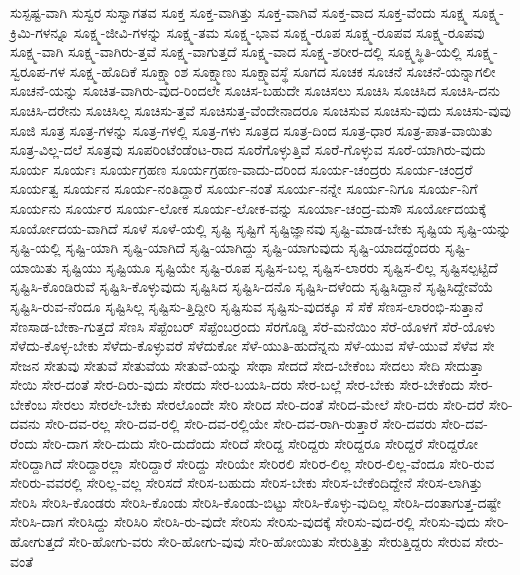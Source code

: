 {ಸುಸ್ಪಷ್ಟ-ವಾಗಿ
ಸುಸ್ವರ
ಸುಸ್ವಾಗತವ
ಸೂಕ್ತ
ಸೂಕ್ತ-ವಾಗಿತ್ತು
ಸೂಕ್ತ-ವಾಗಿವೆ
ಸೂಕ್ತ-ವಾದ
ಸೂಕ್ತ-ವೆಂದು
ಸೂಕ್ಷ್ಮ
ಸೂಕ್ಷ್ಮ-ಕ್ರಿಮಿ-ಗಳನ್ನೂ
ಸೂಕ್ಷ್ಮ-ಜೀವಿ-ಗಳನ್ನು
ಸೂಕ್ಷ್ಮ-ತಮ
ಸೂಕ್ಷ್ಮ-ಭಾವ
ಸೂಕ್ಷ್ಮ-ರೂಪ
ಸೂಕ್ಷ್ಮ-ರೂಪವ
ಸೂಕ್ಷ್ಮ-ರೂಪವು
ಸೂಕ್ಷ್ಮ-ವಾಗಿ
ಸೂಕ್ಷ್ಮ-ವಾಗಿರು-ತ್ತವೆ
ಸೂಕ್ಷ್ಮ-ವಾಗುತ್ತದೆ
ಸೂಕ್ಷ್ಮ-ವಾದ
ಸೂಕ್ಷ್ಮ-ಶರೀರ-ದಲ್ಲಿ
ಸೂಕ್ಷ್ಮಸ್ಥಿತಿ-ಯಲ್ಲಿ
ಸೂಕ್ಷ್ಮ-ಸ್ವರೂಪ-ಗಳ
ಸೂಕ್ಷ್ಮ-ಹೊದಿಕೆ
ಸೂಕ್ಷ್ಮಾಂಶ
ಸೂಕ್ಷ್ಮಾಣು
ಸೂಕ್ಷ್ಮಾವಸ್ಥೆ
ಸೂಗದ
ಸೂಚಕ
ಸೂಚನೆ
ಸೂಚನೆ-ಯನ್ನಾಗಲೀ
ಸೂಚನೆ-ಯನ್ನು
ಸೂಚಿತ-ವಾಗಿರು-ವುದ-ರಿಂದಲೇ
ಸೂಚಿಸ-ಬಹುದೇ
ಸೂಚಿಸಲು
ಸೂಚಿಸಿ
ಸೂಚಿಸಿದ
ಸೂಚಿಸಿ-ದನು
ಸೂಚಿಸಿ-ದರೇನು
ಸೂಚಿಸಿಲ್ಲ
ಸೂಚಿಸು-ತ್ತವೆ
ಸೂಚಿಸುತ್ತ-ವೆಂದೇನಾದರೂ
ಸೂಚಿಸುವ
ಸೂಚಿಸು-ವುದು
ಸೂಚಿಸು-ವುವು
ಸೂಜಿ
ಸೂತ್ರ
ಸೂತ್ರ-ಗಳನ್ನು
ಸೂತ್ರ-ಗಳಲ್ಲಿ
ಸೂತ್ರ-ಗಳು
ಸೂತ್ರದ
ಸೂತ್ರ-ದಿಂದ
ಸೂತ್ರ-ಧಾರ
ಸೂತ್ರ-ಪಾತ-ವಾಯಿತು
ಸೂತ್ರ-ವಿಲ್ಲ-ದಲೆ
ಸೂತ್ರವು
ಸೂಪರಿಂಟೆಂಡೆಂಟ-ರಾದ
ಸೂರೆಗೊಳ್ಳುತ್ತಿವೆ
ಸೂರೆ-ಗೊಳ್ಳುವ
ಸೂರೆ-ಯಾಗಿರು-ವುದು
ಸೂರ್ಯ
ಸೂರ್ಯಃ
ಸೂರ್ಯಗ್ರಹಣ
ಸೂರ್ಯಗ್ರಹಣ-ವಾದು-ದರಿಂದ
ಸೂರ್ಯ-ಚಂದ್ರರು
ಸೂರ್ಯ-ಚಂದ್ರರೆ
ಸೂರ್ಯತ್ವ
ಸೂರ್ಯನ
ಸೂರ್ಯ-ನಂತಿದ್ದಾರೆ
ಸೂರ್ಯ-ನಂತೆ
ಸೂರ್ಯ-ನನ್ನೇ
ಸೂರ್ಯ-ನಿಗೂ
ಸೂರ್ಯ-ನಿಗೆ
ಸೂರ್ಯನು
ಸೂರ್ಯರ
ಸೂರ್ಯ-ಲೋಕ
ಸೂರ್ಯ-ಲೋಕ-ವನ್ನು
ಸೂರ್ಯಾ-ಚಂದ್ರ-ಮಸೌ
ಸೂರ್ಯೋದಯಕ್ಕೆ
ಸೂರ್ಯೋದಯ-ವಾಗಿದೆ
ಸೂಳೆ
ಸೂಳೆ-ಯಲ್ಲಿ
ಸೃಷ್ಟಿ
ಸೃಷ್ಟಿಗೆ
ಸೃಷ್ಟಿಜ್ಞಾನವು
ಸೃಷ್ಟಿ-ಮಾಡ-ಬೇಕು
ಸೃಷ್ಟಿಯ
ಸೃಷ್ಟಿ-ಯನ್ನು
ಸೃಷ್ಟಿ-ಯಲ್ಲಿ
ಸೃಷ್ಟಿ-ಯಾಗಿ
ಸೃಷ್ಟಿ-ಯಾಗಿದೆ
ಸೃಷ್ಟಿ-ಯಾಗಿದ್ದು
ಸೃಷ್ಟಿ-ಯಾಗುವುದು
ಸೃಷ್ಟಿ-ಯಾದದ್ದೆಂದರು
ಸೃಷ್ಟಿ-ಯಾಯಿತು
ಸೃಷ್ಟಿಯು
ಸೃಷ್ಟಿಯೂ
ಸೃಷ್ಟಿಯೇ
ಸೃಷ್ಟಿ-ರೂಪ
ಸೃಷ್ಟಿಸ-ಬಲ್ಲ
ಸೃಷ್ಟಿಸ-ಲಾರರು
ಸೃಷ್ಟಿಸ-ಲಿಲ್ಲ
ಸೃಷ್ಟಿಸಲ್ಪಟ್ಟಿದೆ
ಸೃಷ್ಟಿಸಿ-ಕೊಂಡಿರುವೆ
ಸೃಷ್ಟಿಸಿ-ಕೊಳ್ಳುವುದು
ಸೃಷ್ಟಿಸಿದ
ಸೃಷ್ಟಿಸಿ-ದನೊ
ಸೃಷ್ಟಿಸಿ-ದಳೆಂದು
ಸೃಷ್ಟಿಸಿದ್ದಾನೆ
ಸೃಷ್ಟಿಸಿದ್ದೇವೆಯೆ
ಸೃಷ್ಟಿಸಿ-ರುವ-ನೆಂದೂ
ಸೃಷ್ಟಿಸಿಲ್ಲ
ಸೃಷ್ಟಿಸು-ತ್ತಿದ್ದೀರಿ
ಸೃಷ್ಟಿಸುವ
ಸೃಷ್ಟಿಸು-ವುದಕ್ಕೂ
ಸೆ
ಸೆಕೆ
ಸೆಣಸ-ಲಾರಂಭಿ-ಸುತ್ತಾನೆ
ಸೆಣಸಾಡ-ಬೇಕಾ-ಗುತ್ತದೆ
ಸೆಣಸಿ
ಸೆಪ್ಟೆಂಬರ್
ಸೆಪ್ಟೆಂಬರ್ರಂದು
ಸೆರಗೊಡ್ಡಿ
ಸೆರೆ-ಮನೆಯಿಂ
ಸೆರೆ-ಯೊಳಗೆ
ಸೆರೆ-ಯೊಳು
ಸೆಳೆದು-ಕೊಳ್ಳ-ಬೇಕು
ಸೆಳೆದು-ಕೊಳ್ಳುವರೆ
ಸೆಳೆದುಕೋ
ಸೆಳೆ-ಯುತಿ-ಹುದೆನ್ನನು
ಸೆಳೆ-ಯುವ
ಸೆಳೆ-ಯುವೆ
ಸೆಳೆವ
ಸೇ
ಸೇಜನ
ಸೇತುವು
ಸೇತುವೆ
ಸೇತುವೆಯ
ಸೇತುವೆ-ಯನ್ನು
ಸೇಥಾ
ಸೇದದೆ
ಸೇದ-ಬೇಕೆಂಬ
ಸೇದಲು
ಸೇದಿ
ಸೇದುತ್ತಾ
ಸೇಯಿ
ಸೇರ-ದಂತೆ
ಸೇರ-ದಿರು-ವುದು
ಸೇರದು
ಸೇರ-ಬಯಸಿ-ದರು
ಸೇರ-ಬಲ್ಲೆ
ಸೇರ-ಬೇಕು
ಸೇರ-ಬೇಕೆಂದು
ಸೇರ-ಬೇಕೆಂಬ
ಸೇರಲು
ಸೇರಲೇ-ಬೇಕು
ಸೇರಲೊಂದೇ
ಸೇರಿ
ಸೇರಿದ
ಸೇರಿ-ದಂತೆ
ಸೇರಿದ-ಮೇಲೆ
ಸೇರಿ-ದರು
ಸೇರಿ-ದರೆ
ಸೇರಿ-ದವನು
ಸೇರಿ-ದವ-ರಲ್ಲ
ಸೇರಿ-ದವ-ರಲ್ಲಿ
ಸೇರಿ-ದವ-ರಲ್ಲಿಯೇ
ಸೇರಿ-ದವ-ರಾಗಿ-ರುತ್ತಾರೆ
ಸೇರಿ-ದವರು
ಸೇರಿ-ದವ-ರೆಂದು
ಸೇರಿ-ದಾಗ
ಸೇರಿ-ದುದು
ಸೇರಿ-ದುದೆಂದು
ಸೇರಿದೆ
ಸೇರಿದ್ದ
ಸೇರಿದ್ದರು
ಸೇರಿದ್ದರೂ
ಸೇರಿದ್ದರೆ
ಸೇರಿದ್ದರೋ
ಸೇರಿದ್ದಾಗಿದೆ
ಸೇರಿದ್ದಾರಲ್ಲಾ
ಸೇರಿದ್ದಾರೆ
ಸೇರಿದ್ದು
ಸೇರಿಯೇ
ಸೇರಿರಲಿ
ಸೇರಿರ-ಲಿಲ್ಲ
ಸೇರಿರ-ಲಿಲ್ಲ-ವೆಂದೂ
ಸೇರಿ-ರುವ
ಸೇರಿರು-ವವರಲ್ಲಿ
ಸೇರಿಲ್ಲ-ವಲ್ಲ
ಸೇರಿಸದೆ
ಸೇರಿಸ-ಬಹುದು
ಸೇರಿಸ-ಬೇಕು
ಸೇರಿಸ-ಬೇಕೆಂದಿದ್ದೇನೆ
ಸೇರಿಸ-ಲಾಗಿತ್ತು
ಸೇರಿಸಿ
ಸೇರಿಸಿ-ಕೊಂಡರು
ಸೇರಿಸಿ-ಕೊಂಡು
ಸೇರಿಸಿ-ಕೊಂಡು-ಬಿಟ್ಟು
ಸೇರಿಸಿ-ಕೊಳ್ಳು-ವುದಿಲ್ಲ
ಸೇರಿಸಿ-ದಂತಾಗುತ್ತ-ದಷ್ಟೇ
ಸೇರಿಸಿ-ದಾಗ
ಸೇರಿಸಿದ್ದು
ಸೇರಿಸಿರಿ
ಸೇರಿಸಿ-ರು-ವುದೇ
ಸೇರಿಸು
ಸೇರಿಸು-ವುದಕ್ಕೆ
ಸೇರಿಸು-ವುದ-ರಲ್ಲಿ
ಸೇರಿಸು-ವುದು
ಸೇರಿ-ಹೋಗುತ್ತದೆ
ಸೇರಿ-ಹೋಗು-ವರು
ಸೇರಿ-ಹೋಗು-ವುವು
ಸೇರಿ-ಹೋಯಿತು
ಸೇರುತ್ತಿತ್ತು
ಸೇರುತ್ತಿದ್ದರು
ಸೇರುವ
ಸೇರು-ವಂತೆ
}
